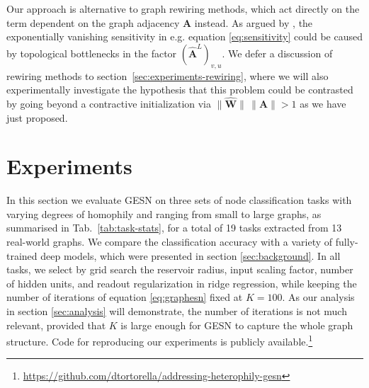 \documentclass[final,5p,times,twocolumn]{elsarticle}
\begin{document}
Our approach is alternative to graph rewiring methods, which act directly on the term dependent on the graph adjacency $\mathbf{A}$ instead.
As argued by \cite{Topping2022}, the exponentially vanishing sensitivity in e.g. equation \eqref{eq:sensitivity} could be caused by topological bottlenecks in the factor $(\mathbf{\hat{A}}^{L})_{v,u}$.
We defer a discussion of rewiring methods to section~\ref{sec:experiments-rewiring}, where we will also experimentally investigate the hypothesis that this problem could be contrasted by going beyond a contractive initialization via $\lVert \mathbf{\hat{W}} \rVert \, \lVert \mathbf{A} \rVert > 1$ as we have just proposed.

\section{Experiments}
\label{sec:experiments}

In this section we evaluate GESN on three sets of node classification tasks with varying degrees of homophily and ranging from small to large graphs, as summarised in Tab.~\ref{tab:task-stats}, for a total of 19 tasks extracted from 13 real-world graphs.
We compare the classification accuracy with a variety of fully-trained deep models, which were presented in section \ref{sec:background}.
In all tasks, we select by grid search the reservoir radius, input scaling factor, number of hidden units, and readout regularization in ridge regression, while keeping the number of iterations of equation \eqref{eq:graphesn} fixed at $K = 100$.
As our analysis in section \ref{sec:analysis} will demonstrate, the number of iterations is not much relevant, provided that $K$ is large enough for GESN to capture the whole graph structure.
Code for reproducing our experiments is publicly available.\footnote{\url{https://github.com/dtortorella/addressing-heterophily-gesn}}
\end{document}
